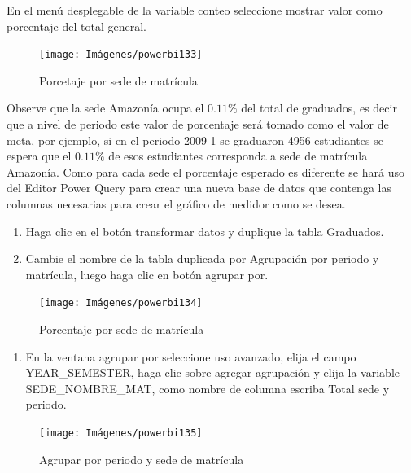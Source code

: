 \documentclass[
]{book}
\providecommand{\tightlist}{%
  \setlength{\itemsep}{0pt}\setlength{\parskip}{0pt}}
\begin{document}
En el menú desplegable de la variable conteo seleccione mostrar valor como porcentaje del total general.

\begin{figure}

{\centering \texttt{[image: Imágenes/powerbi133]} 

}

\caption{Porcetaje por sede de matrícula}\label{fig:verporcentajeporsedematricula-fig}
\end{figure}

Observe que la sede Amazonía ocupa el \(0.11\%\) del total de graduados, es decir que a nivel de periodo este valor de porcentaje será tomado como el valor de meta, por ejemplo, si en el periodo 2009-1 se graduaron 4956 estudiantes se espera que el \(0.11\%\) de esos estudiantes corresponda a sede de matrícula Amazonía. Como para cada sede el porcentaje esperado es diferente se hará uso del Editor Power Query para crear una nueva base de datos que contenga las columnas necesarias para crear el gráfico de medidor como se desea.

\begin{enumerate}
\def\labelenumi{\arabic{enumi}.}
\item
  Haga clic en el botón transformar datos y duplique la tabla Graduados.
\item
  Cambie el nombre de la tabla duplicada por Agrupación por periodo y matrícula, luego haga clic en botón agrupar por.
\end{enumerate}

\begin{figure}

{\centering \texttt{[image: Imágenes/powerbi134]} 

}

\caption{Porcentaje por sede de matrícula}\label{fig:agruparporperiodosede-fig}
\end{figure}

\begin{enumerate}
\def\labelenumi{\arabic{enumi}.}
\setcounter{enumi}{2}
\tightlist
\item
  En la ventana agrupar por seleccione uso avanzado, elija el campo YEAR\_SEMESTER, haga clic sobre agregar agrupación y elija la variable SEDE\_NOMBRE\_MAT, como nombre de columna escriba Total sede y periodo.
\end{enumerate}

\begin{figure}

{\centering \texttt{[image: Imágenes/powerbi135]} 

}

\caption{Agrupar por periodo y sede de matrícula}\label{fig:agruparporperiodosedematricula-fig}
\end{figure}
\end{document}
